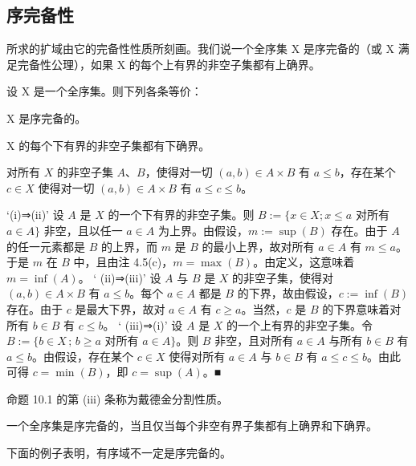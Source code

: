 \subsection*{序完备性}

所求的扩域由它的完备性性质所刻画。我们说一个全序集 X 是序完备的（或 X 满足完备性公理），如果 X 的每个上有界的非空子集都有上确界。

\begin{proposition}

设 X 是一个全序集。则下列各条等价：

\begin{subitems}
\item

X 是序完备的。

\item

X 的每个下有界的非空子集都有下确界。

\item

对所有 $ X $ 的非空子集 $ A $、$ B $，使得对一切 $ (a,b) \in A \times B $ 有 $ a \leq b $，存在某个 $ c \in X $ 使得对一切 $ (a,b) \in A \times B $ 有 $ a \leq c \leq b $。

\proofhead
‘(i)⇒(ii)’ 设 $ A $ 是 $ X $ 的一个下有界的非空子集。则 $ B := \{x \in X; x \leq a $ 对所有 $ a \in A\}$ 非空，且以任一 $ a \in A $ 为上界。由假设，$ m := \sup(B) $ 存在。由于 $ A $ 的任一元素都是 $ B $ 的上界，而 $ m $ 是 $ B $ 的最小上界，故对所有 $ a \in A $ 有 $ m \leq a $。于是 $ m $ 在 $ B $ 中，且由注 4.5(c)，$ m = \max(B) $。由定义，这意味着 $ m = \inf(A) $。
‘ (ii)⇒(iii)’ 设 $ A $ 与 $ B $ 是 $ X $ 的非空子集，使得对 $ (a, b) \in A \times B $ 有 $ a \leq b $。每个 $ a \in A $ 都是 $ B $ 的下界，故由假设，$ c := \inf(B) $ 存在。由于 $ c $ 是最大下界，故对 $ a \in A $ 有 $ c \geq a $。当然，$ c $ 是 $ B $ 的下界意味着对所有 $ b \in B $ 有 $ c \leq b $。
‘ (iii)⇒(i)’ 设 $ A $ 是 $ X $ 的一个上有界的非空子集。令 $ B := \{ b \in X \, ; \, b \geq a $ 对所有 $ a \in A \}$。则 $ B $ 非空，且对所有 $ a \in A $ 与所有 $ b \in B $ 有 $ a \leq b $。由假设，存在某个 $ c \in X $ 使得对所有 $ a \in A $ 与 $ b \in B $ 有 $ a \leq c \leq b $。由此可得 $ c = \min(B) $，即 $ c = \sup(A) $。■
\end{subitems}

\end{proposition}

命题 10.1 的第 (iii) 条称为戴德金分割性质。

\begin{corollary}

一个全序集是序完备的，当且仅当每个非空有界子集都有上确界和下确界。

下面的例子表明，有序域不一定是序完备的。

\end{corollary}

